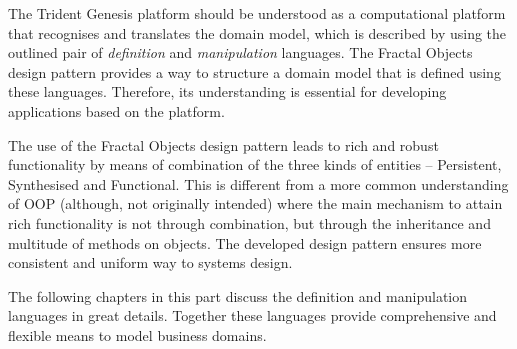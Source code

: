   The Trident Genesis platform should be understood as a computational platform that recognises and translates the domain model, which is described by using the outlined pair of \emph{definition} and \emph{manipulation} languages.
  The Fractal Objects design pattern provides a way to structure a domain model that is defined using these languages.
  Therefore, its understanding is essential for developing applications based on the platform.
  
  The use of the Fractal Objects design pattern leads to rich and robust functionality by means of combination of the three kinds of entities -- Persistent, Synthesised and Functional.
  This is different from a more common understanding of OOP (although, not originally intended) where the main mechanism to attain rich functionality is not through combination, but through the inheritance and multitude of methods on objects.
  The developed design pattern ensures more consistent and uniform way to systems design.
  
  The following chapters in this part discuss the definition and manipulation languages in great details.
  Together these languages provide comprehensive and flexible means to model business domains.